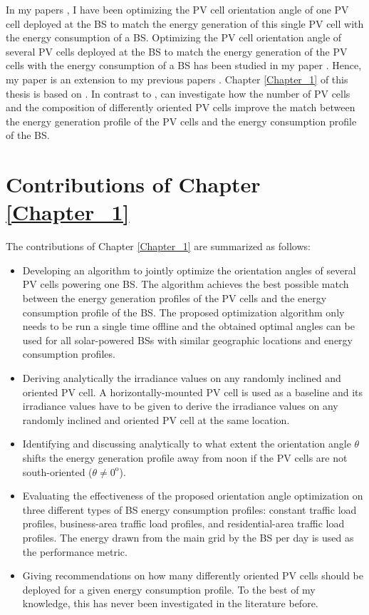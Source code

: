 In my papers \cite{my,my2,my4}, I have been optimizing the PV cell orientation angle of one PV cell deployed at the BS to match the energy generation of this single PV cell with the energy consumption of a BS. Optimizing the PV cell orientation angle of several PV cells deployed at the BS to match the energy generation of the PV cells with the energy consumption of a BS has been studied in my paper \cite{sub}. Hence, my paper \cite{sub} is an extension to my previous papers \cite{my,my2,my4}. Chapter \ref{Chapter_1} of this thesis is based on \cite{sub}. In contrast to \cite{my,my2,my4}, \cite{sub} can investigate how the number of PV cells and the composition of differently oriented PV cells improve the match between the energy generation profile of the PV cells and the energy consumption profile of the BS.

\section{Contributions of Chapter \ref{Chapter_1}}
The contributions of Chapter \ref{Chapter_1} are summarized as follows:

\begin{itemize}
\item Developing an algorithm to jointly optimize the orientation angles of several PV cells powering one BS. The algorithm achieves the best possible match between the energy generation profiles of the PV cells and the energy consumption profile of the BS. The proposed optimization algorithm only needs to be run a single time offline and the obtained optimal angles can be used for all solar-powered BSs with similar geographic locations and energy consumption profiles.
\item Deriving analytically the irradiance values on any randomly inclined and oriented PV cell. A horizontally-mounted PV cell is used as a baseline and its irradiance values have to be given to derive the irradiance values on any randomly inclined and oriented PV cell at the same location.
\item Identifying and discussing analytically to what extent the orientation angle $\theta$ shifts the energy generation profile away from noon if the PV cells are not south-oriented ($\theta \neq 0^\mathrm{o}$).  
\item Evaluating the effectiveness of the proposed orientation angle optimization on three different types of BS energy consumption profiles: constant traffic load profiles, business-area traffic load profiles, and residential-area traffic load profiles. The energy drawn from the main grid by the BS per day is used as the performance metric.
\item Giving recommendations on how many differently oriented PV cells should be deployed for a given energy consumption profile. To the best of my knowledge, this has never been investigated in the literature before.
\end{itemize}



